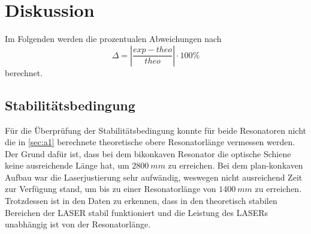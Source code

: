 \section{Diskussion}
\label{sec:Diskussion}
Im Folgenden werden die prozentualen Abweichungen nach
\begin{equation}\label{eq:1}
    \Delta = |\frac{exp - theo}{theo}|\cdot 100\%
\end{equation}
berechnet.

%        

\subsection{Stabilitätsbedingung}
Für die Überprüfung der Stabilitätsbedingung konnte für beide Resonatoren nicht die in \autoref{sec:a1} berechnete theoretische obere Resonatorlänge vermessen werden. Der Grund dafür ist, dass bei dem bikonkaven Resonator die optische Schiene keine ausreichende Länge hat, um $\SI{2800}{mm}$ zu erreichen. Bei dem plan-konkaven Aufbau war die Laserjustierung sehr aufwändig, weswegen nicht ausreichend Zeit zur Verfügung stand, um bis zu einer Resonatorlänge von $\SI{1400}{mm}$ zu erreichen.
Trotzdessen ist in den Daten zu erkennen, dass in den theoretisch stabilen Bereichen der LASER stabil funktioniert und die Leistung des LASERs unabhängig ist von der Resonatorlänge.
